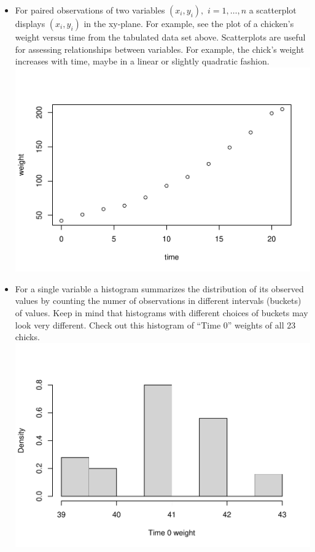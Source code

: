 \documentclass[
]{book}
\begin{document}
\begin{itemize}
\item
  For paired observations of two variables \((x_i, y_i), \,\,i = 1, \ldots, n\) a scatterplot displays \((x_i, y_i)\) in the xy-plane. For example, see the plot of a chicken's weight versus time from the tabulated data set above. Scatterplots are useful for assessing relationships between variables. For example, the chick's weight increases with time, maybe in a linear or slightly quadratic fashion.
  \includegraphics{01-intro_files/figure-latex/unnamed-chunk-2-1.pdf}
\item
  For a single variable a histogram summarizes the distribution of its observed values by counting the numer of observations in different intervals (buckets) of values. Keep in mind that histograms with different choices of buckets may look very different. Check out this histogram of ``Time 0'' weights of all 23 chicks.
  \includegraphics{01-intro_files/figure-latex/unnamed-chunk-3-1.pdf}

\end{itemize}
\end{document}
